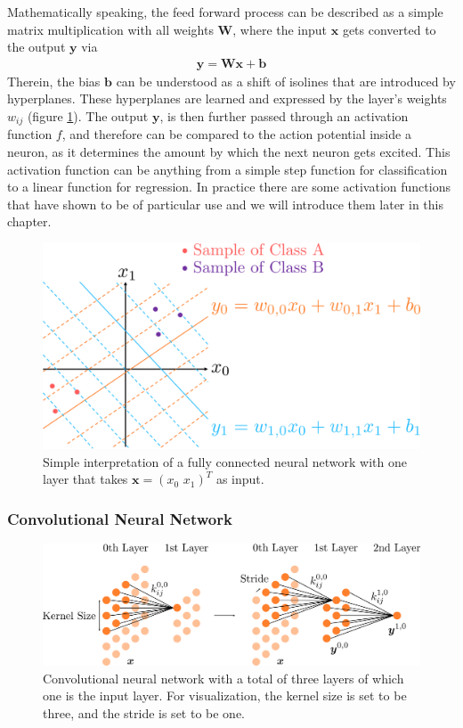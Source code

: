Mathematically speaking, the feed forward process can be described as a simple matrix multiplication with all weights $\bm{W}$, where the input $\bm{x}$ gets converted to the output $\bm{y}$ via
\begin{align}
	\bm{y} = \bm{W}\bm{x}+\bm{b}
	\label{eq::321_fully_connected}
\end{align}
Therein, the bias $\bm{b}$ can be understood as a shift of isolines that are introduced by hyperplanes. These hyperplanes are learned and expressed by the layer's weights $w_{ij}$ (figure \ref{fig::321_classification}). The output $\bm{y}$, is then further passed through an activation function $f$, and therefore can be compared to the action potential inside a neuron, as it determines the amount by which the next neuron gets excited. This activation function can be anything from a simple step function for classification to a linear function for regression. In practice there are some activation functions that have shown to be of particular use and we will introduce them later in this chapter.
\begin{figure}[h]
	\centering
	\includegraphics[scale=.28]{chapters/03_background/img/classification.png}
	\caption{Simple interpretation of a fully connected neural network with one layer that takes $\bm{x}=(x_0\,\,x_1)^T$ as input.}
	\label{fig::321_classification}
\end{figure}
\subsubsection{Convolutional Neural Network}
\cite{fukushima1980neocognitron} %
\cite{zeiler2014visualizing} %
\begin{figure}[h]
	\centering
	\includegraphics[scale=.28]{chapters/03_background/img/convolutional.png}
	\caption{Convolutional neural network with a total of three layers of which one is the input layer. For visualization, the kernel size is set to be three, and the stride is set to be one.}
	\label{fig::321_convolutional}
\end{figure}
